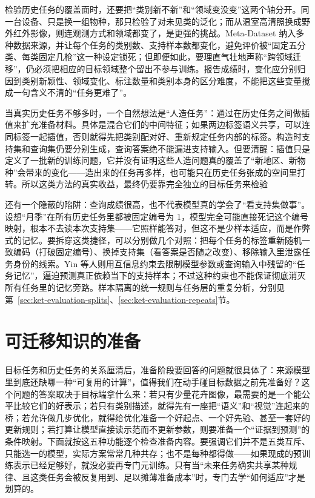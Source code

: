 检验历史任务的覆盖面时，还要把“类别新不新”和“领域变没变”这两个轴分开。同一台设备、只是换一组物种，那只检验了对未见类的泛化；而从温室高清照换成野外红外影像，则连观测方式和领域都变了，是更强的挑战。Meta-Dataset 纳入多种数据来源，并让每个任务的类别数、支持样本数都变化，避免评价被“固定五分类、每类固定几枪”这一种设定锁死；但即便如此，要理直气壮地声称“跨领域迁移”，仍必须把相应的目标领域整个留出不参与训练。报告成绩时，变化应分别归因到类别新颖性、领域变化、标注数量和类别本身的区分难度，不能把这些变量搅成一句含义不清的“任务更难了”。

当真实历史任务不够多时，一个自然想法是“人造任务”：通过在历史任务之间做插值来扩充准备材料。具体是混合它们的中间特征；如果两边标签语义共享，可以连同标签一起插值，否则就得先把类别配对好、重新规定任务内部的标签。构造时支持集和查询集仍要分别生成，查询答案绝不能漏进支持输入。但要清醒：插值只是定义了一批新的训练问题，它并没有证明这些人造问题真的覆盖了“新地区、新物种”会带来的变化——造出来的任务再多样，也可能只在历史任务张成的空间里打转。所以这类方法的真实收益，最终仍要靠完全独立的目标任务来检验

还有一个隐蔽的陷阱：查询成绩很高，也不代表模型真的学会了“看支持集做事”。设想“月季”在所有历史任务里都被固定编号为 1，模型完全可能直接死记这个编号映射，根本不去读本次支持集——它照样能答对，但这不是少样本适应，而是作弊式的记忆。要拆穿这类捷径，可以分别做几个对照：把每个任务的标签重新随机一致编码（打破固定编号）、换掉支持集（看答案是否随之改变）、移除输入里泄露任务身份的线索。Yin 等人则用互信息约束去限制模型参数或查询输入中残留的“任务记忆”，逼迫预测真正依赖当下的支持样本；不过这种约束也不能保证彻底消灭所有任务里的记忆旁路。样本隔离的统一规则与任务层的重复分析，分别见第~\ref{sec:ket-evaluation-splits}、\ref{sec:ket-evaluation-repeats}节。

\section{可迁移知识的准备}
\label{sec:ket-transfer-preparation}

目标任务和历史任务的关系厘清后，准备阶段要回答的问题就很具体了：来源模型里到底还缺哪一种“可复用的计算”，值得我们在动手碰目标数据之前先准备好？这个问题的答案取决于目标端拿什么来：若只有少量花卉图像，最需要的是一个能公平比较它们的好表示；若只有类别描述，就得先有一座把“语义”和“视觉”连起来的桥；若允许做几步优化，就得给优化准备一个好起点、一个好先验、甚至一套好的更新规则；若打算让模型直接读示范而不更新参数，则要准备一个“证据到预测”的条件映射。下面就按这五种功能逐个检查准备内容。要强调它们并不是五类互斥、只能选一的模型，实际方案常常几种共存；也不是每种都得做——如果现成的预训练表示已经足够好，就没必要再专门元训练。只有当“未来任务确实共享某种规律、且这类任务会被反复用到、足以摊薄准备成本”时，专门去学“如何适应”才是划算的。

